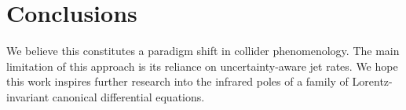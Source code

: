 \section{Conclusions}\label{sec:conclusions}

We believe this constitutes a paradigm shift in collider phenomenology.
The main limitation of this approach is its reliance on
uncertainty-aware jet rates. We hope this work inspires further research
into the infrared poles of a family of Lorentz-invariant canonical
differential equations.

